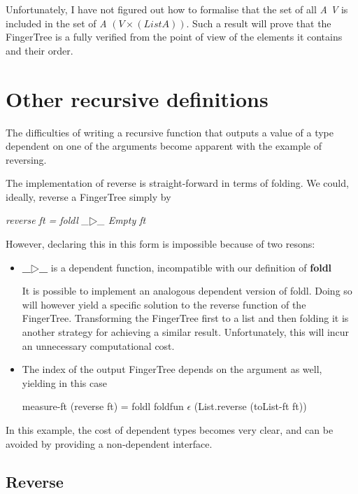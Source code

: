 \documentclass[12pt,twoside,notitlepage]{report}
\begin{document}
Unfortunately, I have not figured out how to formalise that the set of all  \textit{A V} is included in the set of  \textit{A} $(V \times (List A))$. Such a result will prove that the FingerTree is a fully verified from the point of view of the elements it contains and their order. 



\section{Other recursive definitions}

The difficulties of writing a recursive function that outputs a value of a type dependent on one of the arguments become apparent with the example of reversing.

The implementation of reverse is straight-forward in terms of folding. We could, ideally, reverse a FingerTree simply by 

\begin{center}
\textit{reverse ft = foldl \_$▷$\_ Empty ft}
\end{center}

However, declaring this in this form is impossible because of two resons:

\begin{itemize}
\item \textbf{\_$▷$\_} is a dependent function, incompatible with our definition of \textbf{foldl} \cite{foldl}

It is possible to implement an analogous dependent version of foldl. Doing so will however yield a specific solution to the reverse function of the FingerTree.
Transforming the FingerTree first to a list and then folding it is another strategy for achieving a similar result. Unfortunately, this will incur an unnecessary computational cost.
 
\item The index of the output FingerTree depends on the argument as well, yielding in this case 
\begin{center}
measure-ft (reverse ft) = foldl foldfun $\epsilon$ (List.reverse (toList-ft ft))
\end{center}
\end{itemize}

In this example, the cost of dependent types becomes very clear, and can be avoided by providing a non-dependent interface.

\subsection{Reverse}
\end{document}
